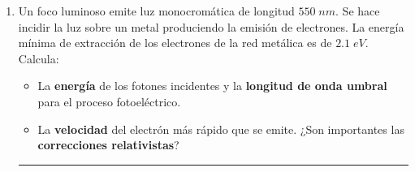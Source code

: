 \documentclass[a4paper,12pt]{exam}
\newcommand{\halmos}{\vspace*{-7mm}
	
					\begin{flushright}
						\rule{1mm}{2.5mm} 
					\end{flushright}\vspace*{-6mm}
						
					  }
\renewcommand{\qed}{\halmos}
\begin{document}
\begin{enumerate}
 			
%	    

		
	
%	
%		
%			
%	
	
	\item Un foco luminoso emite luz monocromática de longitud $550\;nm$. Se hace incidir 				la luz sobre un metal produciendo la emisión de electrones. La energía mínima de extracción de los 						electrones de la red metálica es de $2.1\;eV$. Calcula:
			\begin{itemize}
				\item[a)] La \textbf{energía} de los fotones incidentes y la \textbf{longitud de onda umbral} para el proceso fotoeléctrico.
				\item[b)] La \textbf{velocidad} del electrón más rápido que se emite. ¿Son importantes las \textbf{correcciones relativistas}?
			\end{itemize}		 
		\qed
		

\end{enumerate}
\end{document}
